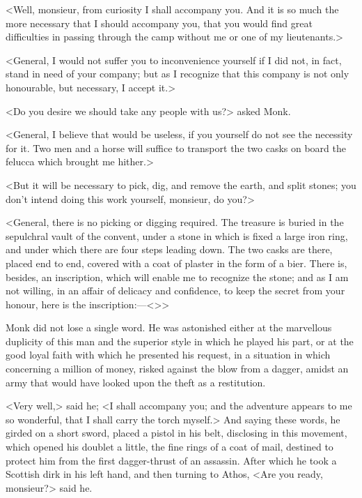 <Well, monsieur, from curiosity I shall accompany you. And it is so much the more necessary that I should accompany you, that you would find great difficulties in passing through the camp without me or one of my lieutenants.>

<General, I would not suffer you to inconvenience yourself if I did not, in fact, stand in need of your company; but as I recognize that this company is not only honourable, but necessary, I accept it.>

<Do you desire we should take any people with us?> asked Monk.

<General, I believe that would be useless, if you yourself do not see the necessity for it. Two men and a horse will suffice to transport the two casks on board the felucca which brought me hither.>

<But it will be necessary to pick, dig, and remove the earth, and split stones; you don't intend doing this work yourself, monsieur, do you?>

<General, there is no picking or digging required. The treasure is buried in the sepulchral vault of the convent, under a stone in which is fixed a large iron ring, and under which there are four steps leading down. The two casks are there, placed end to end, covered with a coat of plaster in the form of a bier. There is, besides, an inscription, which will enable me to recognize the stone; and as I am not willing, in an affair of delicacy and confidence, to keep the secret from your honour, here is the inscription:—<>>

Monk did not lose a single word. He was astonished either at the marvellous duplicity of this man and the superior style in which he played his part, or at the good loyal faith with which he presented his request, in a situation in which concerning a million of money, risked against the blow from a dagger, amidst an army that would have looked upon the theft as a restitution.

<Very well,> said he; <I shall accompany you; and the adventure appears to me so wonderful, that I shall carry the torch myself.> And saying these words, he girded on a short sword, placed a pistol in his belt, disclosing in this movement, which opened his doublet a little, the fine rings of a coat of mail, destined to protect him from the first dagger-thrust of an assassin. After which he took a Scottish dirk in his left hand, and then turning to Athos, <Are you ready, monsieur?> said he.

